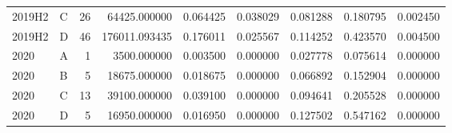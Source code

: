 \begin{tabular}{llrrrrrrr}
2019H2 & C & 26 & 64425.000000 & 0.064425 & 0.038029 & 0.081288 & 0.180795 & 0.002450 \\
2019H2 & D & 46 & 176011.093435 & 0.176011 & 0.025567 & 0.114252 & 0.423570 & 0.004500 \\
2020 & A & 1 & 3500.000000 & 0.003500 & 0.000000 & 0.027778 & 0.075614 & 0.000000 \\
2020 & B & 5 & 18675.000000 & 0.018675 & 0.000000 & 0.066892 & 0.152904 & 0.000000 \\
2020 & C & 13 & 39100.000000 & 0.039100 & 0.000000 & 0.094641 & 0.205528 & 0.000000 \\
2020 & D & 5 & 16950.000000 & 0.016950 & 0.000000 & 0.127502 & 0.547162 & 0.000000 \\
\bottomrule
\end{tabular}
